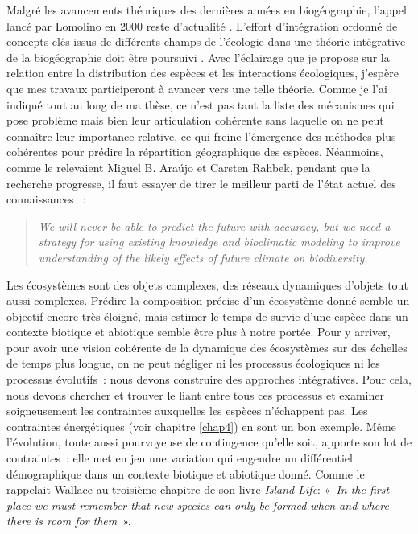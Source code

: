 Malgré les avancements théoriques des dernières années en biogéographie,
l'appel lancé par Lomolino en 2000 reste d'actualité
\citep{Lomolino2000}. L'effort d'intégration ordonné de concepts clés
issus de différents champs de l'écologie dans une théorie intégrative de
la biogéographie doit être poursuivi \citep{Thuiller2013}. Avec
l'éclairage que je propose sur la relation entre la distribution des
espèces et les interactions écologiques, j'espère que mes travaux
participeront à avancer vers une telle théorie. Comme je l'ai indiqué
tout au long de ma thèse, ce n'est pas tant la liste des mécanismes qui
pose problème mais bien leur articulation cohérente sans laquelle on ne
peut connaître leur importance relative, ce qui freine l'émergence des
méthodes plus cohérentes pour prédire la répartition géographique des
espèces. Néanmoins, comme le relevaient Miguel B. Araújo et Carsten
Rahbek, pendant que la recherche progresse, il faut essayer de tirer le
meilleur parti de l'état actuel des connaissances \citep{Araujo2006}~:

\begin{quote}
\emph{We will never be able to predict the future with accuracy, but we
need a strategy for using existing knowledge and bioclimatic modeling to
improve understanding of the likely effects of future climate on
biodiversity.}
\end{quote}

Les écosystèmes sont des objets complexes, des réseaux dynamiques
d'objets tout aussi complexes. Prédire la composition précise d'un
écosystème donné semble un objectif encore très éloigné, mais estimer le
temps de survie d'une espèce dans un contexte biotique et abiotique
semble être plus à notre portée. Pour y arriver, pour avoir une vision
cohérente de la dynamique des écosystèmes sur des échelles de temps plus
longue, on ne peut négliger ni les processus écologiques ni les
processus évolutifs~: nous devons construire des approches intégratives.
Pour cela, nous devons chercher et trouver le liant entre tous ces
processus et examiner soigneusement les contraintes auxquelles les
espèces n'échappent pas. Les contraintes énergétiques (voir chapitre
\ref{chap4}) en sont un bon exemple. Même l'évolution, toute aussi
pourvoyeuse de contingence qu'elle soit, apporte son lot de
contraintes~: elle met en jeu une variation qui engendre un différentiel
démographique dans un contexte biotique et abiotique donné. Comme le
rappelait Wallace au troisième chapitre de son livre \emph{Island Life}:
«~\emph{In the first place we must remember that new species can only be
formed when and where there is room for them}~».
